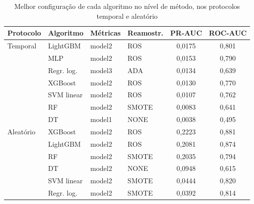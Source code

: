 \begin{table}[htbp]
    \centering
    \footnotesize
    \caption{Melhor configuração de cada algoritmo no nível de método, nos protocolos temporal e aleatório}
    \label{tab:res-melhores}
    \begin{tabular}{llllcc}
        \toprule
        Protocolo & Algoritmo & Métricas & Reamostr. & PR-AUC & ROC-AUC \\
        \midrule
        Temporal & LightGBM   & model2 & ROS   & 0,0175 & 0,801 \\
                 & MLP        & model2 & ROS   & 0,0153 & 0,790 \\
                 & Regr. log. & model3 & ADA   & 0,0134 & 0,639 \\
                 & XGBoost    & model2 & ROS   & 0,0130 & 0,770 \\
                 & SVM linear & model2 & ROS   & 0,0107 & 0,762 \\
                 & RF         & model2 & SMOTE & 0,0083 & 0,641 \\
                 & DT         & model1 & NONE  & 0,0038 & 0,495 \\
        \midrule
        Aleatório & XGBoost    & model2 & ROS   & 0,2223 & 0,881 \\
                  & LightGBM   & model2 & ROS   & 0,2081 & 0,874 \\
                  & RF         & model2 & SMOTE & 0,2035 & 0,794 \\
                  & DT         & model2 & NONE  & 0,0948 & 0,615 \\
                  & SVM linear & model2 & SMOTE & 0,0444 & 0,820 \\
                  & Regr. log. & model2 & SMOTE & 0,0392 & 0,814 \\
        \bottomrule
    \end{tabular}
\end{table}%
